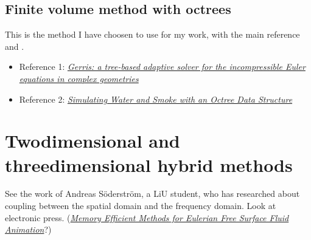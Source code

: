 \subsection{Finite volume method with octrees}

This is the method I have choosen to use for my work, with the main reference \citealp{Losasso2004} and \citep{Popinet2003}.

\begin{itemize}
    \item Reference 1: \textit{\href{http://gfs.sourceforge.net/gerris.pdf}{Gerris: a tree-based adaptive solver for the incompressible Euler equations in complex geometries}}
    \item Reference 2: \textit{\href{http://physbam.stanford.edu/~fedkiw/papers/stanford2004-02.pdf}{Simulating Water and Smoke with an Octree Data Structure}}
\end{itemize}

\section{Twodimensional and threedimensional hybrid methods}

See the work of Andreas Söderström, a LiU student, who has researched about coupling between the spatial domain and the frequency domain. Look at electronic press. (\textit{\href{http://liu.diva-portal.org/smash/get/diva2:359805/FULLTEXT01}{Memory Efficient Methods for Eulerian Free Surface Fluid Animation}}?)